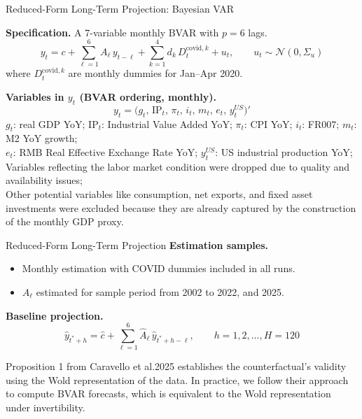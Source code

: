 \documentclass[10pt,aspectratio=169,t]{beamer}
\begin{document}
\begin{frame}{Reduced-Form Long-Term Projection: Bayesian VAR}

\textbf{Specification.} A 7-variable monthly BVAR with $p=6$ lags.
\[
y_t = c + \sum_{\ell=1}^{6} A_\ell\, y_{t-\ell} + \sum_{k=1}^{4} d_k\, D_t^{\text{covid},k} + u_t,
\qquad
u_t \sim \mathcal{N}(0,\Sigma_u)
\]
where $D_t^{\text{covid},k}$ are monthly dummies for Jan--Apr 2020.

\vspace{0.3em}
\textbf{Variables in $y_t$ (BVAR ordering, monthly).}
{\small
\[
y_t = \bigl(g_t,\, \text{IP}_t,\, \pi_t,\, i_t,\, m_t,\, e_t,\, y_t^{US}\bigr)'
\]
$g_t$: real GDP YoY; $\text{IP}_t$: Industrial Value Added YoY; $\pi_t$: CPI YoY; $i_t$: FR007; $m_t$: M2 YoY growth;\\ $e_t$: RMB Real Effective Exchange Rate YoY; $y_t^{US}$: US industrial production YoY; \\Variables reflecting the labor market condition were dropped due to quality and availability issues;\\
Other potential variables like consumption, net exports, and fixed asset investments were excluded because they are already captured by the construction of the monthly GDP proxy.
}

\end{frame}
\begin{frame}{Reduced-Form Long-Term Projection }
\hypertarget{slide:ltp2}{}
\vspace{0.3em}
\textbf{Estimation samples.}
\begin{itemize}\itemsep0.1em
      \item Monthly estimation with COVID dummies included in all runs.
      \item $A_\ell$ estimated for sample period from 2002 to 2022, and 2025.
\end{itemize}

\textbf{Baseline projection.}
\[
\hat{y}_{t^*+h} = \hat{c} + \sum_{\ell=1}^{6} \hat{A}_\ell\, \hat{y}_{t^*+h-\ell},
\qquad h=1,2,\ldots,H=120
\]
\textcolor{spgray}{\scriptsize\hyperlink{app:gdp_compare}{}}

Proposition 1 from Caravello et al.2025 establishes the counterfactual's validity using the Wold representation of the data. In practice, we follow their approach to compute BVAR forecasts, which is equivalent to the Wold representation under invertibility.

\end{frame}
\end{document}
